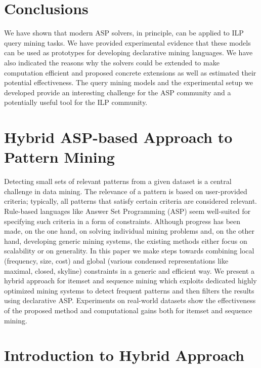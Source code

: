 \section{Conclusions}\label{sec:conclusions}
We have shown that modern ASP solvers, in principle, can be applied to ILP query mining tasks. We have provided experimental evidence that these models can be used as prototypes for developing declarative mining languages. We have also indicated the reasons why the solvers could be extended to make computation efficient and proposed concrete extensions as well as estimated their potential effectiveness. The query mining models and the experimental setup we developed provide an interesting challenge for the ASP community and a potentially useful tool for the ILP community.




\section{Hybrid ASP-based Approach to Pattern Mining}

  Detecting small sets of relevant patterns from a given dataset is a central challenge in data mining. The relevance of a pattern is based on user-provided criteria; typically, all patterns that satisfy certain criteria are considered relevant. Rule-based languages like Answer Set Programming (ASP) seem well-suited for specifying such criteria in a form of constraints.  Although progress has been made, on the one hand, on solving individual mining problems and, on the other hand, developing generic mining systems, the existing methods either focus on scalability or on generality.  In this paper we make steps towards combining local (frequency, size, cost) and global (various condensed representations like maximal, closed, skyline) constraints in a generic and efficient way. We present a hybrid approach for itemset and sequence mining which exploits dedicated highly optimized mining systems to detect frequent patterns and then filters the results using declarative ASP. Experiments on real-world datasets show the effectiveness of the proposed method and computational gains both for itemset and sequence mining. 
 
\section{Introduction to Hybrid Approach}
